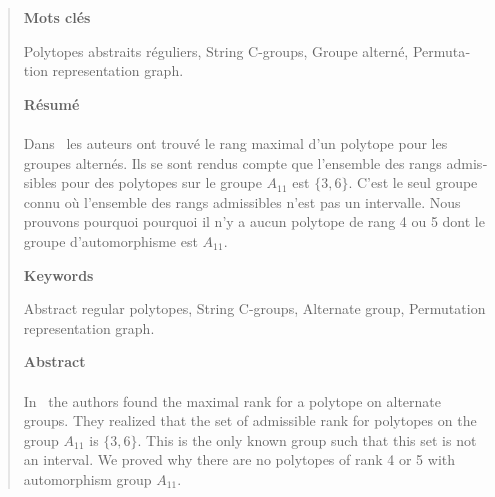 \cleardoublepage{}

\thispagestyle{plain}

\hspace{3cm}

\begin{quote}

\vfill{}

\begin{otherlanguage}{french}

\begin{center}
  \textbf{Mots clés}
\end{center}

Polytopes abstraits réguliers, String C-groups, Groupe alterné, Permutation representation graph.

\begin{center}
  \textbf{Résumé}
\end{center}


\paragraph{}
Dans~\cite{highestRankOfAn} les auteurs ont trouvé le rang maximal d'un polytope pour les groupes alternés. Ils se sont rendus compte que l'ensemble des rangs admissibles pour des polytopes sur le groupe $A_{11}$ est $\{3,6\}$. C'est le seul groupe connu où l'ensemble des rangs admissibles n'est pas un intervalle. Nous prouvons pourquoi pourquoi il n'y a aucun polytope de rang 4 ou 5 dont le groupe d'automorphisme est $A_{11}$.

\end{otherlanguage}

\vfill

\begin{center}
  \textbf{Keywords}
\end{center}

Abstract regular polytopes, String C-groups, Alternate group, Permutation representation graph.

\begin{center}
  \textbf{Abstract}
\end{center}

\paragraph{}
In~\cite{highestRankOfAn} the authors found the maximal rank for a polytope on alternate groups. They realized that the set of admissible rank for polytopes on the group $A_{11}$ is $\{3,6\}$. This is the only known group such that this set is not an interval. We proved why there are no polytopes of rank 4 or 5 with automorphism group $A_{11}$.

\vfill

\end{quote}
